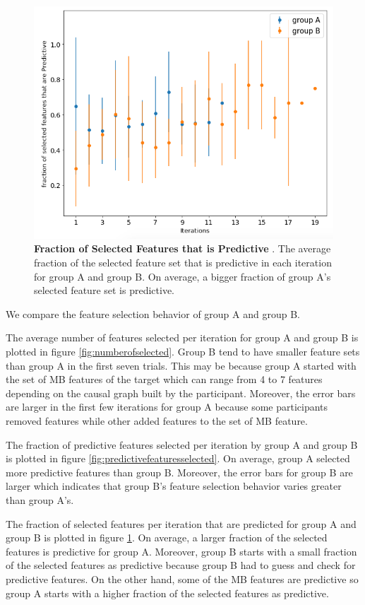 \begin{figure}
    \centering
    \includegraphics[width=.75\textwidth]{selectedfeaturethatarepredictive}
    \caption{\textbf{Fraction of Selected Features that is Predictive }. The average fraction of the selected feature set that is predictive in each iteration for group A and group B. On average, a bigger fraction of group A's selected feature set is predictive.}
    \label{fig:selectedfeaturethatarepredictive}
\end{figure}

We compare the feature selection behavior of group A and group B. 

The average number of features selected per iteration for group A and group B is plotted in figure \ref{fig:numberofselected}. Group B tend to have smaller feature sets than group A in the first seven trials. This may be because group A started with the set of MB features of the target which can range from 4 to 7 features depending on the causal graph built by the participant. Moreover, the error bars are larger in the first few iterations for group A because some participants removed features while other added features to the set of MB feature. 

The fraction of predictive features selected per iteration by group A and group B is plotted in figure \ref{fig:predictivefeaturesselected}. On average, group A selected more predictive features than group B. Moreover, the error bars for group B are larger which indicates that group B's feature selection behavior varies greater than group A's. 

The fraction of selected features per iteration that are predicted for group A and group B is plotted in figure \ref{fig:selectedfeaturethatarepredictive}. On average, a larger fraction of the selected features is predictive for group A. Moreover, group B starts with a small fraction of the selected features as predictive because group B had to guess and check for predictive features. On the other hand, some of the MB features are predictive so group A starts with a higher fraction of the selected features as predictive. 

